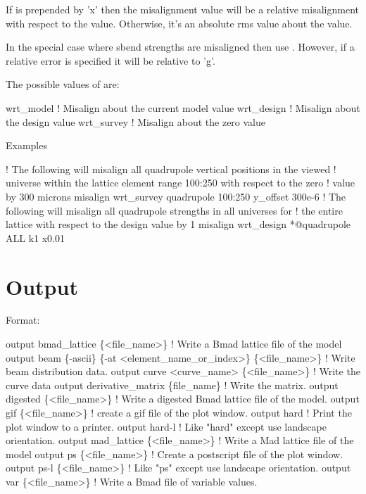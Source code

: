 If  is prepended by 'x' then the misalignment value will be
a relative misalignment with respect to the  value. Otherwise, it's an 
absolute rms value about the  value.

In the special case where sbend strengths are misaligned then use
. However, if a relative error is specified it will be 
relative to 'g'.

The possible values of  are:
\begin{example}
  wrt_model          ! Misalign about the current model value
  wrt_design         ! Misalign about the design value
  wrt_survey         ! Misalign about the zero value
\end{example}

Examples
\begin{example}
   ! The following will misalign all quadrupole vertical positions in the viewed
   ! universe within the lattice element range 100:250 with respect to the zero 
   ! value by 300 microns
  misalign wrt_survey quadrupole 100:250 y_offset 300e-6
   ! The following will misalign all quadrupole strengths in all universes for
   ! the entire lattice with respect to the design value by 1%
  misalign wrt_design *@quadrupole ALL k1 x0.01
\end{example}

\section{Output}
\label{s:output}

Format:
\begin{example}
  output bmad_lattice \{<file_name>\}       ! Write a Bmad lattice file of the model
  output beam \{-ascii\} \{-at <element_name_or_index>\} \{<file_name>\} 
                                          ! Write beam distribution data.
  output curve <curve_name> \{<file_name>\} ! Write the curve data
  output derivative_matrix \{file_name\}    ! Write the  matrix.
  output digested \{<file_name>\}     ! Write a digested Bmad lattice file of the model.
  output gif \{<file_name>\}          ! create a gif file of the plot window.
  output hard                       ! Print the plot window to a printer.
  output hard-l                     ! Like "hard" except use landscape orientation. 
  output mad_lattice \{<file_name>\}  ! Write a Mad lattice file of the model
  output ps \{<file_name>\}           ! Create a postscript file of the plot window.
  output ps-l \{<file_name>\}         ! Like "ps" except use landscape orientation.
  output var \{<file_name>\}          ! Write a Bmad file of variable values.
\end{example}

